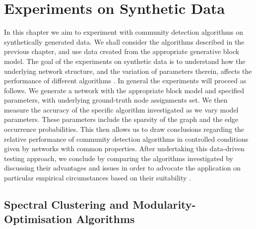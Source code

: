 
\chapter{Experiments on Synthetic Data}

\label{cha:experimentsOnSyntheticData}


In this chapter we aim to experiment with community detection algorithms on synthetically generated data.
We shall consider the algorithms described in the previous chapter, and use data created from the appropriate generative block model.
The goal of the experiments on synthetic data is to understand how the underlying
network structure, and the variation of parameters therein, affects the performance of different algorithms \cite{RLK12}.
In general the experiments will proceed as follows.
We generate a network with the appropriate block model and specified parameters, with underlying ground-truth node assignments set.
We then measure the accuracy of the specific algorithm investigated as we vary model parameters.
These parameters include the sparsity of the graph and the edge occurrence probabilities.
This then allows us to draw conclusions regarding the relative performance of community detection algorithms in controlled conditions given by networks with common properties.
After undertaking this data-driven testing approach, we conclude by comparing the algorithms investigated by discussing their advantages and issues in order to advocate the application on particular empirical circumstances based on their suitability .


\section{Spectral Clustering and Modularity-Optimisation Algorithms}
\label{sec:spectralClusteringModularityOptimisationAlgorithms}

